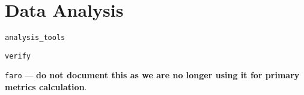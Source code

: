 \section{Data Analysis}
\label{sec:analysis}

\texttt{analysis\_tools}

\texttt{verify}

\texttt{faro} --- \textbf{do not document this as we are no longer using it for primary metrics calculation}.
